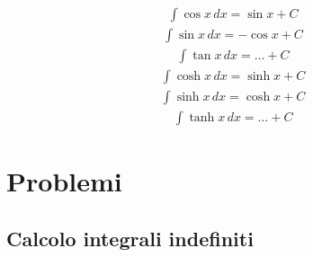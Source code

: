 \documentclass[letterpaper,10pt,italian]{jupyterBook}
\begin{document}
\begin{equation*}
\end{equation*}\begin{equation*}
\begin{split}\int \cos x \, dx = \sin x + C\end{split}
\end{equation*}\begin{equation*}
\begin{split}\int \sin x \, dx =-\cos x + C\end{split}
\end{equation*}\begin{equation*}
\begin{split}\int \tan x \, dx = \dots + C\end{split}
\end{equation*}\begin{equation*}
\begin{split}\int \cosh x \, dx = \sinh x + C\end{split}
\end{equation*}\begin{equation*}
\begin{split}\int \sinh x \, dx = \cosh x + C\end{split}
\end{equation*}\begin{equation*}
\begin{split}\int \tanh x \, dx = \dots + C\end{split}
\end{equation*}
\sphinxstepscope


\section{Problemi}
\label{\detokenize{ch/infinitesimal_calculus/integrals-problems:problemi}}\label{\detokenize{ch/infinitesimal_calculus/integrals-problems:infinitesimal-calculus-integrals-problems}}\label{\detokenize{ch/infinitesimal_calculus/integrals-problems::doc}}

\subsection{Calcolo integrali indefiniti}
\label{\detokenize{ch/infinitesimal_calculus/integrals-problems:calcolo-integrali-indefiniti}} \label{exercise:ch/infinitesimal_calculus/integrals-problems-exercise-0}
\end{document}
